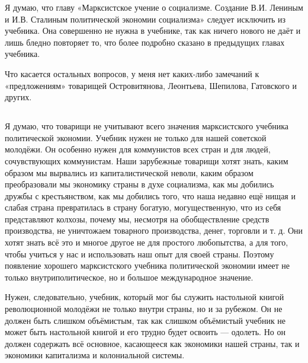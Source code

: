 \documentclass[12pt, a4paper, openany]{book}
\begin{document}
Я думаю, что главу «Марксистское учение о социализме. Создание В.И. Лениным и И.В. Сталиным политической экономии социализма» следует исключить из учебника. Она совершенно не нужна в учебнике, так как ничего нового не даёт и лишь бледно повторяет то, что более подробно сказано в предыдущих главах учебника.



Что касается остальных вопросов, у меня нет каких-либо замечаний к «предложениям» товарищей Островитянова, Леонтьева, Шепилова, Гатовского и других.



\vspace{0.4cm}



\subsection[9. Международное значение марксистского учебника политической экономии]{}



Я думаю, что товарищи не учитывают всего значения марксистского учебника политической экономии. Учебник нужен не только для нашей советской молодёжи. Он особенно нужен для коммунистов всех стран и для людей, сочувствующих коммунистам. Наши зарубежные товарищи хотят знать, каким образом мы вырвались из капиталистической неволи, каким образом преобразовали мы экономику страны в духе социализма, как мы добились дружбы с крестьянством, как мы добились того, что наша недавно ещё нищая и слабая страна превратилась в страну богатую, могущественную, что из себя представляют колхозы, почему мы, несмотря на обобществление средств производства, не уничтожаем товарного производства, денег, торговли и т. д. Они хотят знать всё это и многое другое не для простого любопытства, а для того, чтобы учиться у нас и использовать наш опыт для своей страны. Поэтому появление хорошего марксистского учебника политической экономии имеет не только внутриполитическое, но и большое международное значение.



Нужен, следовательно, учебник, который мог бы служить настольной книгой революционной молодёжи не только внутри страны, но и за рубежом. Он не должен быть слишком объёмистым, так как слишком объёмистый учебник не может быть настольной книгой и его трудно будет освоить — одолеть. Но он должен содержать всё основное, касающееся как экономики нашей страны, так и экономики капитализма и колониальной системы.
\end{document}

